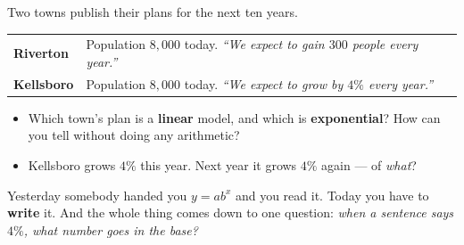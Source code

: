\documentclass[10pt]{article}
\begin{document}
\begin{hookbox}
Two towns publish their plans for the next ten years.
\begin{center}
\small
\renewcommand{\arraystretch}{1.25}
\begin{tabularx}{0.92\linewidth}{@{}l X@{}}
\hline
\textbf{Riverton} & Population $8{,}000$ today. \emph{``We expect to gain $300$ people every year.''} \\
\textbf{Kellsboro} & Population $8{,}000$ today. \emph{``We expect to grow by $4\%$ every year.''} \\
\hline
\end{tabularx}
\end{center}
\begin{itemize}\setlength{\itemsep}{1pt}
  \item Which town's plan is a \textbf{linear} model, and which is \textbf{exponential}? How can you tell without doing any arithmetic? 
  \item Kellsboro grows $4\%$ this year. Next year it grows $4\%$ again --- of \emph{what}? 
\end{itemize}
Yesterday somebody handed you $y=ab^{x}$ and you read it. Today you have to \textbf{write} it. And the
whole thing comes down to one question: \emph{when a sentence says $4\%$, what number goes in the base?}
\end{hookbox}
\end{document}
